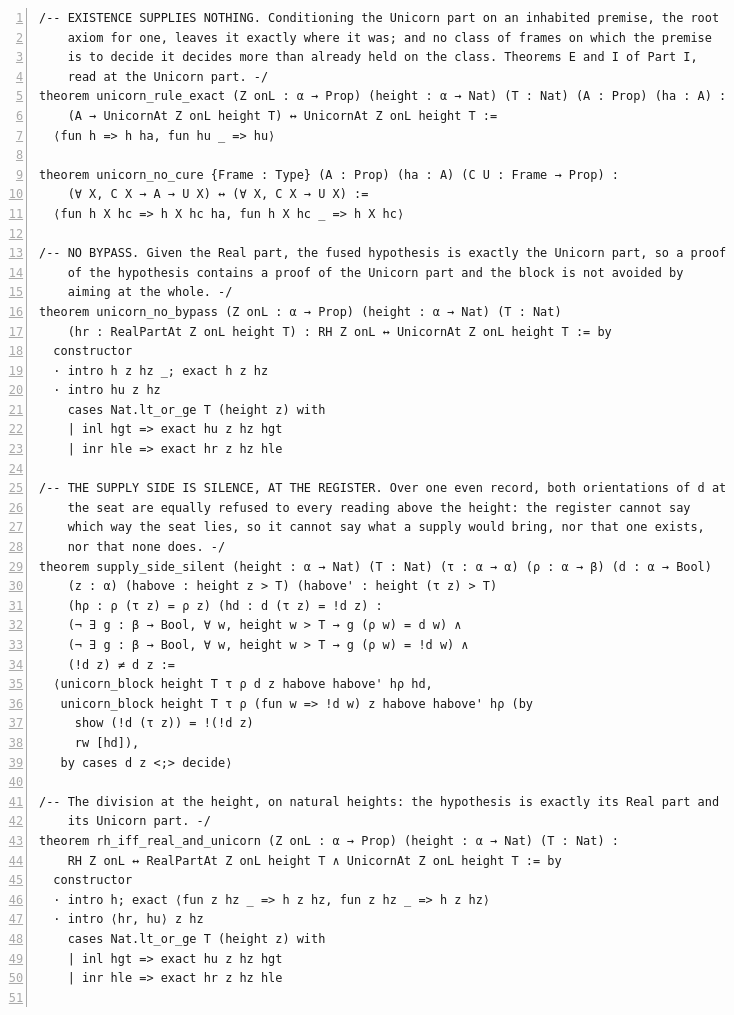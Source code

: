 \documentclass[10pt]{article}
\newcommand{\leansize}{\fontsize{5.5pt}{6.75pt}\selectfont}
\begin{document}
\begin{multicols}{2}
\begin{Verbatim}[numbers=left,firstnumber=1,numbersep=3pt,xleftmargin=2.6em,breaklines=true,breakanywhere=true,breakautoindent=false,breakindent=1.4em,breaksymbolleft={},breakanywheresymbolpre={},fontsize=\leansize]
/-- EXISTENCE SUPPLIES NOTHING. Conditioning the Unicorn part on an inhabited premise, the root
    axiom for one, leaves it exactly where it was; and no class of frames on which the premise
    is to decide it decides more than already held on the class. Theorems E and I of Part I,
    read at the Unicorn part. -/
theorem unicorn_rule_exact (Z onL : α → Prop) (height : α → Nat) (T : Nat) (A : Prop) (ha : A) :
    (A → UnicornAt Z onL height T) ↔ UnicornAt Z onL height T :=
  ⟨fun h => h ha, fun hu _ => hu⟩

theorem unicorn_no_cure {Frame : Type} (A : Prop) (ha : A) (C U : Frame → Prop) :
    (∀ X, C X → A → U X) ↔ (∀ X, C X → U X) :=
  ⟨fun h X hc => h X hc ha, fun h X hc _ => h X hc⟩

/-- NO BYPASS. Given the Real part, the fused hypothesis is exactly the Unicorn part, so a proof
    of the hypothesis contains a proof of the Unicorn part and the block is not avoided by
    aiming at the whole. -/
theorem unicorn_no_bypass (Z onL : α → Prop) (height : α → Nat) (T : Nat)
    (hr : RealPartAt Z onL height T) : RH Z onL ↔ UnicornAt Z onL height T := by
  constructor
  · intro h z hz _; exact h z hz
  · intro hu z hz
    cases Nat.lt_or_ge T (height z) with
    | inl hgt => exact hu z hz hgt
    | inr hle => exact hr z hz hle

/-- THE SUPPLY SIDE IS SILENCE, AT THE REGISTER. Over one even record, both orientations of d at
    the seat are equally refused to every reading above the height: the register cannot say
    which way the seat lies, so it cannot say what a supply would bring, nor that one exists,
    nor that none does. -/
theorem supply_side_silent (height : α → Nat) (T : Nat) (τ : α → α) (ρ : α → β) (d : α → Bool)
    (z : α) (habove : height z > T) (habove' : height (τ z) > T)
    (hρ : ρ (τ z) = ρ z) (hd : d (τ z) = !d z) :
    (¬ ∃ g : β → Bool, ∀ w, height w > T → g (ρ w) = d w) ∧
    (¬ ∃ g : β → Bool, ∀ w, height w > T → g (ρ w) = !d w) ∧
    (!d z) ≠ d z :=
  ⟨unicorn_block height T τ ρ d z habove habove' hρ hd,
   unicorn_block height T τ ρ (fun w => !d w) z habove habove' hρ (by
     show (!d (τ z)) = !(!d z)
     rw [hd]),
   by cases d z <;> decide⟩

/-- The division at the height, on natural heights: the hypothesis is exactly its Real part and
    its Unicorn part. -/
theorem rh_iff_real_and_unicorn (Z onL : α → Prop) (height : α → Nat) (T : Nat) :
    RH Z onL ↔ RealPartAt Z onL height T ∧ UnicornAt Z onL height T := by
  constructor
  · intro h; exact ⟨fun z hz _ => h z hz, fun z hz _ => h z hz⟩
  · intro ⟨hr, hu⟩ z hz
    cases Nat.lt_or_ge T (height z) with
    | inl hgt => exact hu z hz hgt
    | inr hle => exact hr z hz hle


\end{Verbatim}
\end{multicols}
\end{document}
